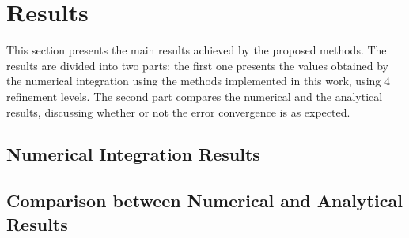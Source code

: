 \section{Results} \label{sec:results}
This section presents the main results achieved by the proposed methods. The results are divided into two parts: the first one presents the values obtained by the numerical integration using the methods implemented in this work, using 4 refinement levels. The second part compares the numerical and the analytical results, discussing whether or not the error convergence is as expected. 

\subsection{Numerical Integration Results}

\subsection{Comparison between Numerical and Analytical Results}
